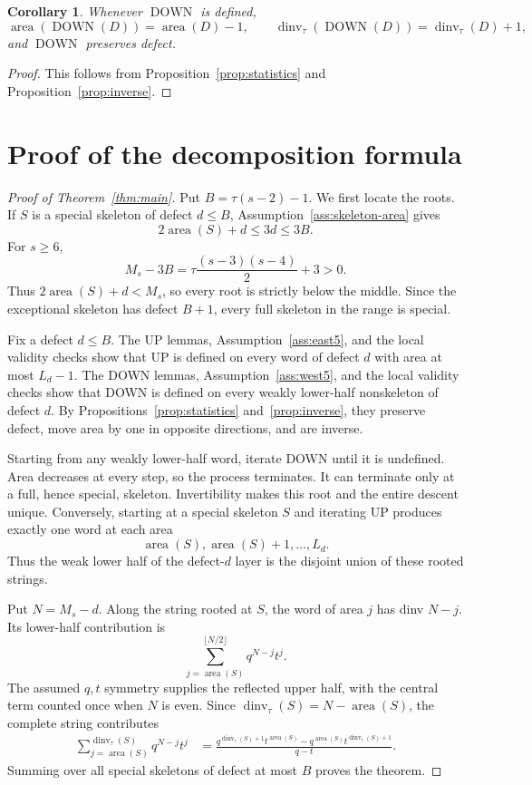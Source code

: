 \documentclass[11pt]{article}
\newtheorem{corollary}[theorem]{Corollary}
\theoremstyle{definition}
\theoremstyle{remark}
\newcommand{\area}{\operatorname{area}}
\newcommand{\dinv}{\operatorname{dinv}}
\newcommand{\DOWN}{\operatorname{DOWN}}
\begin{document}
\begin{corollary}
Whenever $\DOWN$ is defined,
\[
 \area(\DOWN(D))=\area(D)-1,
 \qquad
 \dinv_\tau(\DOWN(D))=\dinv_\tau(D)+1,
\]
and $\DOWN$ preserves defect.
\end{corollary}

\begin{proof}
This follows from Proposition~\ref{prop:statistics} and
Proposition~\ref{prop:inverse}.
\end{proof}

\section{Proof of the decomposition formula}

\begin{proof}[Proof of Theorem~\ref{thm:main}]
Put $B=\tau(s-2)-1$.  We first locate the roots.  If $S$ is a special
skeleton of defect $d\le B$, Assumption~\ref{ass:skeleton-area} gives
\[
  2\area(S)+d\le3d\le3B.
\]
For $s\ge6$,
\[
  M_s-3B
  =\tau\frac{(s-3)(s-4)}2+3>0.
\]
Thus $2\area(S)+d<M_s$, so every root is strictly below the middle.  Since
the exceptional skeleton has defect $B+1$, every full skeleton in the range
is special.

Fix a defect $d\le B$.  The UP lemmas, Assumption~\ref{ass:east5}, and the
local validity checks show that UP is defined on every word of defect $d$
with area at most $L_d-1$.  The DOWN lemmas, Assumption~\ref{ass:west5}, and
the local validity checks show that DOWN is defined on every weakly
lower-half nonskeleton of defect $d$.  By Propositions~\ref{prop:statistics}
and~\ref{prop:inverse}, they preserve defect, move area by one in opposite
directions, and are inverse.

Starting from any weakly lower-half word, iterate DOWN until it is undefined.
Area decreases at every step, so the process terminates.  It can terminate
only at a full, hence special, skeleton.  Invertibility makes this root and
the entire descent unique.  Conversely, starting at a special skeleton $S$
and iterating UP produces exactly one word at each area
\[
  \area(S),\area(S)+1,\ldots,L_d.
\]
Thus the weak lower half of the defect-$d$ layer is the disjoint union of
these rooted strings.

Put $N=M_s-d$.  Along the string rooted at $S$, the word of area $j$ has
dinv $N-j$.  Its lower-half contribution is
\[
  \sum_{j=\area(S)}^{\lfloor N/2\rfloor}q^{N-j}t^j.
\]
The assumed $q,t$ symmetry supplies the reflected upper half, with the
central term counted once when $N$ is even.  Since
$\dinv_\tau(S)=N-\area(S)$, the complete string contributes
\begin{align*}
  \sum_{j=\area(S)}^{\dinv_\tau(S)}q^{N-j}t^j
  &=
  \frac{
  q^{\dinv_\tau(S)+1}t^{\area(S)}
  -q^{\area(S)}t^{\dinv_\tau(S)+1}
  }{q-t}.
\end{align*}
Summing over all special skeletons of defect at most $B$ proves the theorem.
\end{proof}
\end{document}
